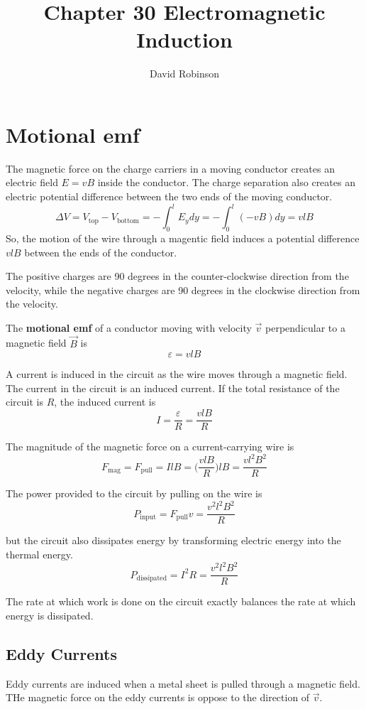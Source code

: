 \documentclass{article}
\title{Chapter 30 Electromagnetic Induction}
\author{David Robinson}
\date{}
\begin{document}
\maketitle

\section*{Motional emf}
The magnetic force on the charge carriers in a moving conductor creates an electric field $E=vB$
inside the conductor. The charge separation also creates an electric potential difference between
the two ends of the moving conductor.
\[\Delta V=V_\text{top} - V_\text{bottom} = -\int_0^l E_y dy =-\int_0^l (-vB)dy=vlB\]
So, the motion of the wire through a magentic field induces a potential difference $vlB$ between
the ends of the conductor.

\vspace{1em}
The positive charges are 90 degrees in the counter-clockwise direction from the velocity, while the
negative charges are 90 degrees in the clockwise direction from the velocity.

\vspace{1em}
The \textbf{motional emf} of a conductor moving with velocity $\vec{v}$ perpendicular to a magnetic
field $\vec{B}$ is \[\varepsilon=vlB\]

A current is induced in the circuit as the wire moves through a magnetic field. The current in the
circuit is an induced current. If the total resistance of the circuit is $R$, the induced current
is \[I=\frac{\varepsilon}{R}=\frac{vlB}{R}\]

The magnitude of the magnetic force on a current-carrying wire is
\[F_\text{mag}=F_\text{pull}=IlB=\Big(\frac{vlB}{R}\Big)lB=\frac{vl^2B^2}{R}\]

The power provided to the circuit by pulling on the wire is
\[P_\text{input}=F_\text{pull} v=\frac{v^2 l^2 B^2}{R}\]

but the circuit also dissipates energy by transforming electric energy into the thermal energy.
\[P_\text{dissipated}=I^2 R=\frac{v^2 l^2 B^2}{R}\]

The rate at which work is done on the circuit exactly balances the rate at which energy is
dissipated.

\subsection*{Eddy Currents}
Eddy currents are induced when a metal sheet is pulled through a magnetic field. THe magnetic force
on the eddy currents is oppose to the direction of $\vec{v}$.
\end{document}

